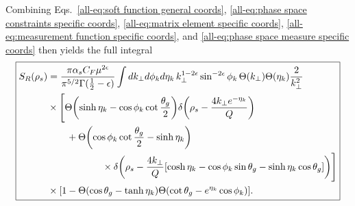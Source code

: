 \documentclass[../thesis.tex]{subfiles}
\begin{document}
	Combining Eqs.~\ref{all-eq:soft function general coords}, \ref{all-eq:phase space constraints specific coords}, \ref{all-eq:matrix element specific coords}, \ref{all-eq:measurement function specific coords}, and \ref{all-eq:phase space measure specific coords} then yields the full integral
	\begin{equation}\label{all-eq:soft function specific coords}
	\boxed{
	\begin{aligned}
		S_R(\rho_s) &= \frac{\pi \alpha_s C_F \mu^{2\epsilon}}{\pi^{5/2} \Gamma(\frac{1}{2} - \epsilon)} \int dk_\perp d\phi_k d\eta_k \,k_\perp^{1 - 2\epsilon} \sin^{-2\epsilon} \phi_k \, \Theta(k_\perp)\Theta(\eta_k) \frac{2}{k_\perp^2} \\
		&\times \Bigg[ \Theta\qty(\sinh\eta_k - \cos\phi_k \cot\frac{\theta_g}{2}) \delta\qty(\rho_s - \frac{4k_\perp e^{-\eta_k}}{Q}) \\
		&\qquad+ \Theta\qty(\cos\phi_k \cot\frac{\theta_g}{2} - \sinh\eta_k) \\
		&\hspace{2cm}\times \delta\qty(\rho_s - \frac{4k_\perp}{Q}\qty[\cosh\eta_k - \cos\phi_k \sin\theta_g - \sinh\eta_k \cos\theta_g]) \Bigg] \\
		&\times \qty[1 - \Theta(\cos\theta_g - \tanh \eta_k)\Theta(\cot\theta_g - e^{\eta_k}\cos\phi_k)].
	\end{aligned}
	}
	\end{equation}
\end{document}
